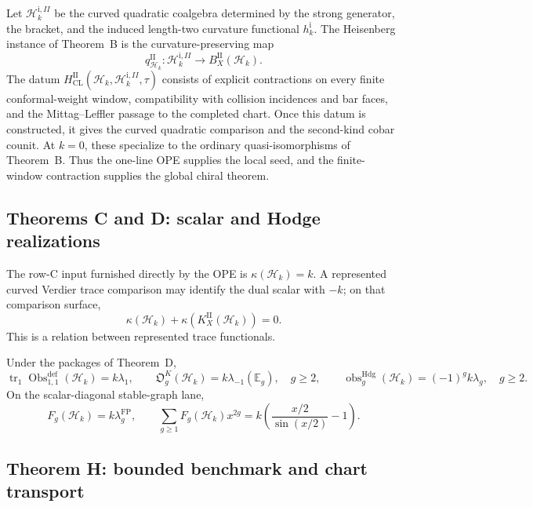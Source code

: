 \documentclass[11pt]{article}
\theoremstyle{plain}
\theoremstyle{definition}
\theoremstyle{remark}
\newcommand{\cH}{\mathcal{H}}
\begin{document}
Let \(\cH_k^{\mathrm i,II}\) be the curved quadratic coalgebra
determined by the strong generator, the bracket, and the induced
length-two curvature functional \(h_k^{\mathrm i}\).  The Heisenberg
instance of Theorem~B is the curvature-preserving map
\begin{equation}\label{eq:heis-cobar}
 q_{\cH_k}^{\mathrm{II}}\colon
 \cH_k^{\mathrm i,II}\longrightarrow B_X^{\mathrm{II}}(\cH_k).
\end{equation}
The datum
\(H_{\mathrm{CL}}^{\mathrm{II}}
(\cH_k,\cH_k^{\mathrm i,II},\tau)\) consists
of explicit contractions on every finite conformal-weight window,
compatibility with collision incidences and bar faces, and the
Mittag--Leffler passage to the completed chart.  Once this datum is
constructed, it gives the curved quadratic comparison and the
second-kind cobar counit.  At \(k=0\), these specialize to the
ordinary quasi-isomorphisms of Theorem~B.  Thus the one-line OPE supplies the local seed,
and the finite-window contraction supplies the global chiral theorem.

\subsection{Theorems C and D: scalar and Hodge realizations}

The row-C input furnished directly by the OPE is
\(\kappa(\cH_k)=k\).  A represented curved Verdier trace comparison
may identify the dual scalar with \(-k\); on that comparison surface,
\begin{equation}\label{eq:heis-complementarity}
 \kappa(\cH_k)+\kappa(K_X^{\mathrm{II}}(\cH_k))=0.
\end{equation}
This is a relation between represented trace functionals.

Under the packages of Theorem~D,
\[
 \operatorname{tr}_1
 \operatorname{Obs}^{\mathrm{def}}_{1,1}(\cH_k)=k\lambda_1,
 \qquad
 \mathfrak O_g^K(\cH_k)=k\lambda_{-1}(\mathbb E_g),\quad g\ge2,
 \qquad
 \operatorname{obs}^{\mathrm{Hdg}}_g(\cH_k)=(-1)^gk\lambda_g,\quad g\ge2.
\]
On the scalar-diagonal stable-graph lane,
\[
 F_g(\cH_k)=k\lambda_g^{\mathrm{FP}},
 \qquad
 \sum_{g\ge1}F_g(\cH_k)x^{2g}
 =k\left(\frac{x/2}{\sin(x/2)}-1\right).
\]

\subsection{Theorem H: bounded benchmark and chart transport}
\end{document}
